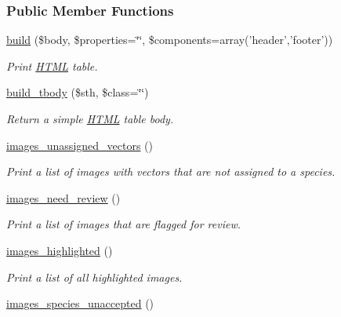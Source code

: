 \subsubsection*{Public Member Functions}
\begin{DoxyCompactItemize}
\item 
\hyperlink{classDataTable_afcaf77a1a8158f843f3881208f0cdac4}{build} (\$body, \$properties=\char`\"{}\char`\"{}, \$components=array('header','footer'))
\begin{DoxyCompactList}\small\item\em Print \hyperlink{classHTML}{H\-T\-M\-L} table. \end{DoxyCompactList}\item 
\hyperlink{classDataTable_a96fdd1a56f76ac72e7a7ecce82a06a1d}{build\-\_\-tbody} (\$sth, \$class=\char`\"{}\char`\"{})
\begin{DoxyCompactList}\small\item\em Return a simple \hyperlink{classHTML}{H\-T\-M\-L} table body. \end{DoxyCompactList}\item 
\hypertarget{classDataTable_a747f48562b9f9ad3cb35bbda429ae7d0}{\hyperlink{classDataTable_a747f48562b9f9ad3cb35bbda429ae7d0}{images\-\_\-unassigned\-\_\-vectors} ()}\label{classDataTable_a747f48562b9f9ad3cb35bbda429ae7d0}

\begin{DoxyCompactList}\small\item\em Print a list of images with vectors that are not assigned to a species. \end{DoxyCompactList}\item 
\hypertarget{classDataTable_acdc88b8674e9af875d9fdbbb6e36bda3}{\hyperlink{classDataTable_acdc88b8674e9af875d9fdbbb6e36bda3}{images\-\_\-need\-\_\-review} ()}\label{classDataTable_acdc88b8674e9af875d9fdbbb6e36bda3}

\begin{DoxyCompactList}\small\item\em Print a list of images that are flagged for review. \end{DoxyCompactList}\item 
\hypertarget{classDataTable_aae1eed20159db0c809e26ab41aee3a18}{\hyperlink{classDataTable_aae1eed20159db0c809e26ab41aee3a18}{images\-\_\-highlighted} ()}\label{classDataTable_aae1eed20159db0c809e26ab41aee3a18}

\begin{DoxyCompactList}\small\item\em Print a list of all highlighted images. \end{DoxyCompactList}\item 
\hypertarget{classDataTable_a133de329decd44c977d5142ef1595803}{\hyperlink{classDataTable_a133de329decd44c977d5142ef1595803}{images\-\_\-species\-\_\-unaccepted} ()}\label{classDataTable_a133de329decd44c977d5142ef1595803}


\end{DoxyCompactItemize}
